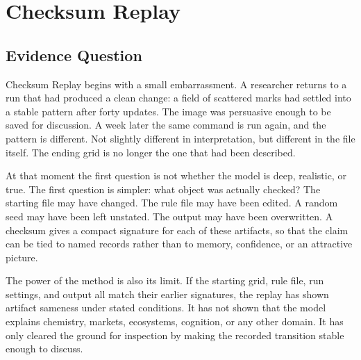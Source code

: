 \documentclass[11pt,a4paper,openany]{book}
\begin{document}
\section{Checksum Replay}
\subsection{Evidence Question}
Checksum Replay begins with a small embarrassment. A researcher returns to a run that had produced a clean change: a field of scattered marks had settled into a stable pattern after forty updates. The image was persuasive enough to be saved for discussion. A week later the same command is run again, and the pattern is different. Not slightly different in interpretation, but different in the file itself. The ending grid is no longer the one that had been described. \cite{nicolis_prigogine_selforg,kauffman_autocatalytic}\par
At that moment the first question is not whether the model is deep, realistic, or true. The first question is simpler: what object was actually checked? The starting file may have changed. The rule file may have been edited. A random seed may have been left unstated. The output may have been overwritten. A checksum gives a compact signature for each of these artifacts, so that the claim can be tied to named records rather than to memory, confidence, or an attractive picture.\par
The power of the method is also its limit. If the starting grid, rule file, run settings, and output all match their earlier signatures, the replay has shown artifact sameness under stated conditions. It has not shown that the model explains chemistry, markets, ecosystems, cognition, or any other domain. It has only cleared the ground for inspection by making the recorded transition stable enough to discuss.\par
\end{document}
